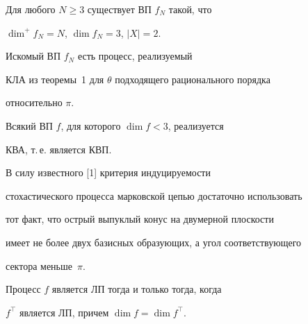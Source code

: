 




\begin{thm}


Для любого $N\ge3$ существует ВП $f_N$ такой, что


$\dim^+f_N=N$, $\dim f_N=3$, $|X|=2$.


\end{thm}





\begin{pf}


Искомый ВП $f_N$ есть процесс, реализуемый


КЛА из теоремы~1 для $\theta$ подходящего рационального порядка 


относительно $\pi$.


\end{pf}





\begin{thm}


Всякий ВП $f$, для которого $\dim f<3$, реализуется


КВА, т.\,е. является КВП.


\end{thm}





\begin{pf}


В силу известного [1] критерия индуцируемости


стохастического процесса марковской цепью достаточно использовать 


тот факт, что острый выпуклый конус на двумерной плоскости 


имеет не более двух базисных образующих, а угол соответствующего 


сектора меньше~$\pi$.


\end{pf}





\begin{thm}


Процесс $f$ является ЛП тогда и только тогда, когда


$f^\top$ является ЛП, причем $\dim f=\dim f^\top$.


\end{thm}





